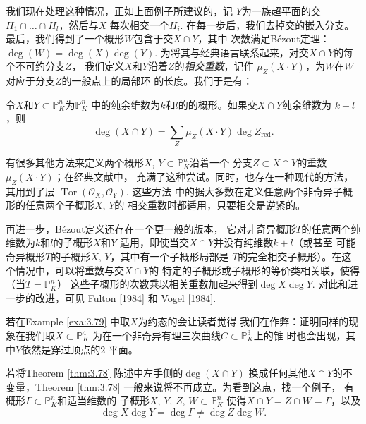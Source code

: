 
我们现在处理这种情况，正如上面例子所建议的，记
$Y$为一族超平面的交$H_1\cap \dots \cap H_l$，然后与$X$
每次相交一个$H_i$. 在每一步后，我们去掉交的嵌入分支。
最后，我们得到了一个概形$W$包含于交$X\cap Y$，其中
次数满足B\'ezout定理：$\deg(W)=\deg(X)\deg(Y)$. 
为将其与经典语言联系起来，对交$X\cap Y$的每个不可约分支$Z$，
我们定义$X$和$Y$沿着$Z$的\textit{相交重数}，记作
$\mu_Z(X\cdot Y)$，为$W$在$W$对应于分支$Z$的一般点上的局部环
的长度。我们于是有：

\begin{thm}
\label{thm:3.80}
	令$X$和$Y\subset \mathbb P_K^n$为$\mathbb P_K^n$
	中的纯余维数为$k$和$l$的的概形。如果交$X\cap Y$纯余维数为
	$k+l$，则
	\[
		\deg(X\cap Y)=\sum_Z\mu_Z(X\cdot Y)\deg Z_{\text{red}}.
	\]
\end{thm}

有很多其他方法来定义两个概形$X$, $Y\subset \mathbb P_K^n$沿着一个
分支$Z\subset X\cap Y$的重数$\mu_Z(X\cdot Y)$；在经典文献中，
充满了这种尝试。同时，也存在一种现代的方法，其用到了层
$\operatorname{Tor}(\mathscr O_X,\mathscr O_Y)$. 这些方法
中的据大多数在定义任意两个非奇异子概形的任意两个子概形$X$, $Y$的
相交重数时都适用，只要相交是逆紧的。

再进一步，B\'ezout定义还存在一个更一般的版本，
它对非奇异概形$T$的任意两个纯维数为$k$和$l$的子概形$X$和$Y$
适用，即使当交$X\cap Y$并没有纯维数$k+l$（或甚至
可能奇异概形$T$的子概形$X$, $Y$，其中有一个子概形局部是
$T$的完全相交子概形）。在这个情况中，可以将重数与交$X\cap Y$的
特定的子概形或子概形的等价类相关联，使得（当$T=\mathbb P_K^n$）
这些子概形的次数乘以相关重数加起来得到$\deg X\deg Y$. 
对此和进一步的改进，可见 Fulton [1984] 和 Vogel [1984].

\begin{exe}\label{exe:3.81}
	若在Example \ref{exa:3.79} 中取$X$为约态的会让读者觉得
	我们在作弊：证明同样的现象在我们取$X\subset \mathbb P_K^4$
	为在一个非奇异有理三次曲线$C\subset \mathbb P_K^3$上的锥
	时也会出现，其中$Y$依然是穿过顶点的$2$-平面。
\end{exe}


\begin{exe}\label{exe:3.82}
	若将Theorem \ref{thm:3.78} 陈述中左手侧的$\deg(X\cap Y)$
	换成任何其他$X\cap Y$的不变量，Theorem \ref{thm:3.78}
	一般来说将不再成立。为看到这点，找一个例子，
	有概形$\Gamma\subset \mathbb P_K^n$和适当维数的
	子概形$X$, $Y$, $Z$, $W\subset \mathbb P_K^n$
	使得$X\cap Y=Z\cap W=\Gamma$，以及
	\[
		\deg X\deg Y=\deg \Gamma\neq \deg Z\deg W.
	\]
\end{exe}

